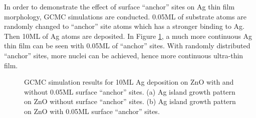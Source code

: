 In order to demonstrate the effect of surface ``anchor'' sites on Ag thin film morphology, \ac{GCMC} simulations are conducted. 0.05\ac{ML} of substrate atoms are randomly changed to ``anchor'' site atoms which has a stronger binding to Ag. Then 10\ac{ML} of Ag atoms are deposited. In Figure \ref{Chap:Ag/ZnO:fig14}, a much more continuous Ag thin film can be seen with 0.05\ac{ML} of ``anchor'' sites. With randomly distributed ``anchor'' sites, more nuclei can be achieved, hence more continuous ultra-thin film.

\newpage
\begingroup
\begin{figure}[!ht]
  \centering
  \label{Chap:Ag/ZnO:fig:14a}
  \label{Chap:Ag/ZnO:fig:14b}
\caption[GCMC simulation results for 10\ac{ML} Ag deposition on ZnO with and without 0.05\ac{ML} surface ``anchor'' sites.]{\ac{GCMC} simulation results for 10\ac{ML} Ag deposition on ZnO with and without 0.05\ac{ML} surface ``anchor'' sites. (a) Ag island growth pattern on ZnO without surface ``anchor'' sites. (b) Ag island growth pattern on ZnO with 0.05\ac{ML} surface ``anchor'' sites.}
\label{Chap:Ag/ZnO:fig14}
\end{figure}
\endgroup